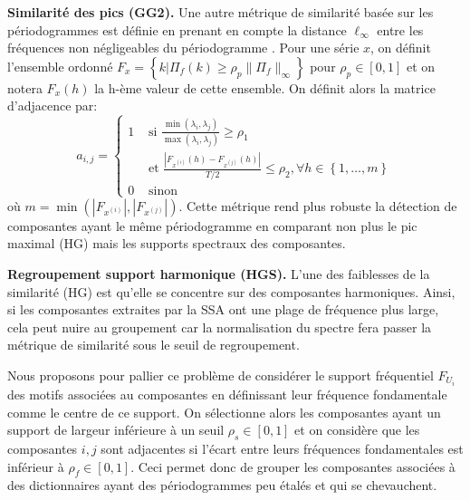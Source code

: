 \documentclass{gretsi}
\newcommand{\set}[1]{\left \{ 1, \dots, #1 \right \}}
\newcommand{\inter}{\left[0, 1\right]}
\begin{document}
\noindent\textbf{Similarité des pics (GG2).}\label{par:GG2}
    Une autre métrique de similarité basée sur les périodogrammes est définie en prenant en compte la distance $\ell_\infty$ entre les fréquences non négligeables du périodogramme \cite{abalov_14_auto}.
    Pour une série $x$, on définit l'ensemble ordonné $F_x = \left \{ k | \Pi_f(k) \ge \rho_p \|\Pi_f\|_\infty \right \}$ pour $\rho_p \in \inter$ et on notera $F_x(h)$ la h-ème valeur de cette ensemble.
    On définit alors la matrice d'adjacence par:
    \begin{equation}
        a_{i, j} = 
        \begin{cases}
	        1 & \text{ si } \displaystyle\frac{\min(\lambda_i, \lambda_j)}{\max(\lambda_i, \lambda_j)} \ge \rho_1\\
	          & \text{ et } \frac{|F_{x^{(i)}}(h) - F_{x^{(j)}}(h)|}{T/2} \le \rho_2, \forall h \in \set{m}\\
	        0 & \text{ sinon}
        \end{cases}
    \end{equation} 
    où $m = \min\left(\left|F_{x^{(i)}}\right|, \left|F_{x^{(j)}}\right|\right)$.
    Cette métrique rend plus robuste la détection de composantes ayant le même périodogramme en comparant non plus le pic maximal (HG) mais les supports spectraux des composantes. 


\noindent\textbf{Regroupement support harmonique (HGS).}\label{par:HGS}
    L'une des faiblesses de la similarité (HG) est qu'elle se concentre sur des composantes harmoniques. 
    Ainsi, si les composantes extraites par la SSA ont une plage de fréquence plus large, cela peut nuire au groupement car la normalisation du spectre fera passer la métrique de similarité sous le seuil de regroupement.

    Nous proposons pour pallier ce problème de considérer le support fréquentiel $F_{U_i}$ des motifs associées au composantes en définissant leur fréquence fondamentale comme le centre de ce support.
    On sélectionne alors les composantes ayant un support de largeur inférieure à un seuil $\rho_s \in \inter$ et on considère que les composantes $i, j$ sont adjacentes si l'écart entre leurs fréquences fondamentales est inférieur à $\rho_f \in \inter$.
    Ceci permet donc de grouper les composantes associées à des dictionnaires ayant des périodogrammes peu étalés et qui se chevauchent.
\end{document}

